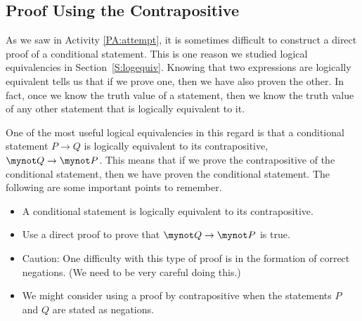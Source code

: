 \subsection*{Proof Using the Contrapositive}
%
%

As we saw in \typeu Activity \ref*{PA:attempt}, it is sometimes difficult to construct a direct proof of a conditional statement.  This is one reason we studied logical equivalencies in Section~\ref{S:logequiv}. Knowing that two expressions are logically equivalent tells us that if we prove one, then we have also proven the other.  In fact, once we know the truth value of a statement, then we know the truth value of any other statement that is logically equivalent to it.

One of the most useful logical equivalencies in this regard is that a conditional statement   $P \to Q$  is logically equivalent to its contrapositive,  
$\mynot  Q \to \mynot  P$.  This means that if we prove the contrapositive of the conditional statement, then we have proven the conditional statement.    The following are some important points to remember.

\begin{itemize}
  \item A conditional statement is logically equivalent to its contrapositive.  %

  \item Use a direct proof to prove that  $ \mynot  Q \to \mynot  P $ is true.

  \item Caution:  One difficulty with this type of proof is in the formation of correct negations. (We need to be very careful doing this.)

  \item We might consider using a proof by contrapositive when the statements  $P$  and  $Q$  are stated as negations.

\end{itemize}

\endinput
